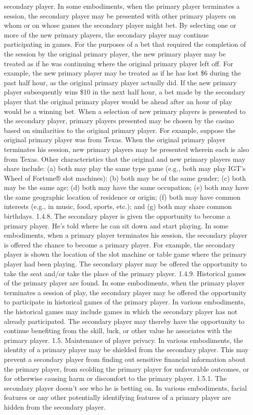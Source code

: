 \documentclass[11pt,a4paper]{article}
\begin{document}
secondary player. In some embodiments, when the primary player terminates a session, the secondary player may be presented with other primary players on whom or on whose games the secondary player might bet. By selecting one or more of the new primary players, the secondary player may continue participating in games. For the purposes of a bet that required the completion of the session by the original primary player, the new primary player may be treated as if he was continuing where the original primary player left off. For example, the new primary player may be treated as if he has lost \$6 during the past half hour, as the original primary player actually did. If the new primary player subsequently wins \$10 in the next half hour, a bet made by the secondary player that the original primary player would be ahead after an hour of play would be a winning bet. When a selection of new primary players is presented to the secondary player, primary players presented may be chosen by the casino based on similarities to the original primary player. For example, suppose the original primary player was from Texas. When the original primary player terminates his session, new primary players may be presented wherein each is also from Texas. Other characteristics that the original and new primary players may share include: (a) both may play the same type game (e.g., both may play IGT's Wheel of Fortune® slot machines); (b) both may be of the same gender; (c) both may be the same age; (d) both may have the same occupation; (e) both may have the same geographic location of residence or origin; (f) both may have common interests (e.g., in music, food, sports, etc.); and (g) both may share common birthdays. 1.4.8. The secondary player is given the opportunity to become a primary player. He's told where he can sit down and start playing. In some embodiments, when a primary player terminates his session, the secondary player is offered the chance to become a primary player. For example, the secondary player is shown the location of the slot machine or table game where the primary player had been playing. The secondary player may be offered the opportunity to take the seat and/or take the place of the primary player. 1.4.9. Historical games of the primary player are found. In some embodiments, when the primary player terminates a session of play, the secondary player may be offered the opportunity to participate in historical games of the primary player. In various embodiments, the historical games may include games in which the secondary player has not already participated. The secondary player may thereby have the opportunity to continue benefiting from the skill, luck, or other value he associates with the primary player. 1.5. Maintenance of player privacy. In various embodiments, the identity of a primary player may be shielded from the secondary player. This may prevent a secondary player from finding out sensitive financial information about the primary player, from scolding the primary player for unfavorable outcomes, or for otherwise causing harm or discomfort to the primary player. 1.5.1. The secondary player doesn't see who he is betting on. In various embodiments, facial features or any other potentially identifying features of a primary player are hidden from the secondary player. 
\end{document}
